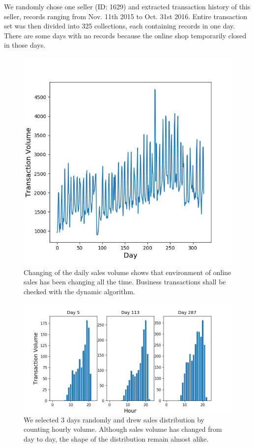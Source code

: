 \documentclass[10pt,conference,letterpaper]{IEEEtran}
\begin{document}
			We randomly chose one seller (ID: 1629) and extracted transaction history of this seller, records ranging from Nov. 11th 2015 to Oct. 31st 2016. Entire transaction set was then divided into 325 collections, each containing records in one day. There are some days with no records because the online shop temporarily closed in those days.
	
			\begin{figure}[!t]
				\centering
				\includegraphics[width=0.75\linewidth]{fig/DailyTransactionVolume.png}
				\caption{Changing of the daily sales volume shows that environment of online sales has been changing all the time. Business transactions shall be checked with the dynamic algorithm.}
				\label{fig:daily-transaction-volume}
			\end{figure}
	
			\begin{figure}[!t]
				\centering
				\includegraphics[width=\linewidth]{fig/SaleDistributions.png}
				\caption{We selected 3 days randomly and drew sales distribution by counting hourly volume. Although sales volume has changed from day to day, the shape of the distribution remain almost alike.}
				\label{fig:sale-distribution-sample}
			\end{figure}
	
\end{document}
